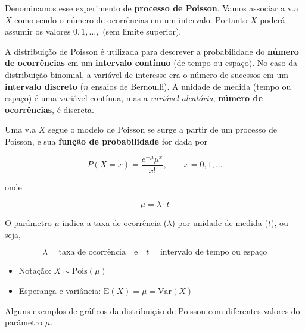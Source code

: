 \documentclass[10pt,a4paper]{book}
\providecommand{\tightlist}{%
  \setlength{\itemsep}{0pt}\setlength{\parskip}{0pt}}
\begin{document}
Denominamos esse experimento de \textbf{processo de Poisson}. Vamos
associar a v.a \(X\) como sendo o número de ocorrências em um intervalo.
Portanto \(X\) poderá assumir os valores \(0, 1, \ldots,\) (sem limite
superior).

A distribuição de Poisson é utilizada para descrever a probabilidade do
\textbf{número de ocorrências} em um \textbf{intervalo contínuo} (de
tempo ou espaço). No caso da distribuição binomial, a variável de
interesse era o número de sucessos em um \textbf{intervalo discreto}
(\(n\) ensaios de Bernoulli). A unidade de medida (tempo ou espaço) é
uma variável contínua, mas a \emph{variável aleatória}, \textbf{número
de ocorrências}, é discreta.

Uma v.a \(X\) segue o modelo de Poisson se surge a partir de um processo
de Poisson, e sua \textbf{função de probabilidade} for dada por

\[
P(X = x) = \frac{e^{-\mu} \mu^x}{x!}, \quad \quad x = 0, 1, \ldots
\]

onde

\[
\mu = \lambda \cdot t
\]

O parâmetro \(\mu\) indica a taxa de ocorrência (\(\lambda\)) por
unidade de medida (\(t\)), ou seja,

\[
    \lambda = \text{taxa de ocorrência} \quad \text{e} \quad t =
    \text{intervalo de tempo ou espaço}
\]

\begin{itemize}
\tightlist
\item
  Notação: \(X \sim \text{Pois}(\mu)\)
\item
  Esperança e variância: \(\text{E}(X) = \mu = \text{Var}(X)\)
\end{itemize}

Alguns exemplos de gráficos da distribuição de Poisson com diferentes
valores do parâmetro \(\mu\).
\end{document}

